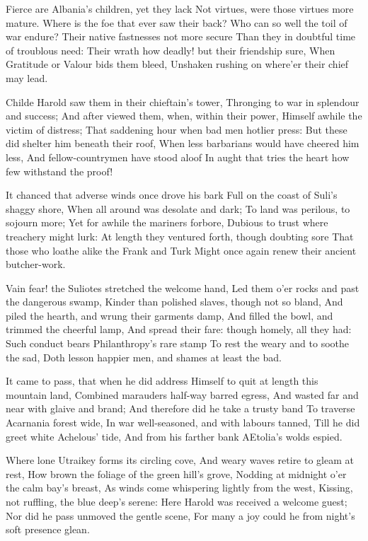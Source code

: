 \documentclass[10pt,twocolumn]{book}
\begin{document}
   Fierce are Albania's children, yet they lack
   Not virtues, were those virtues more mature.
   Where is the foe that ever saw their back?
   Who can so well the toil of war endure?
   Their native fastnesses not more secure
   Than they in doubtful time of troublous need:
   Their wrath how deadly! but their friendship sure,
   When Gratitude or Valour bids them bleed,
Unshaken rushing on where'er their chief may lead.


   Childe Harold saw them in their chieftain's tower,
   Thronging to war in splendour and success;
   And after viewed them, when, within their power,
   Himself awhile the victim of distress;
   That saddening hour when bad men hotlier press:
   But these did shelter him beneath their roof,
   When less barbarians would have cheered him less,
   And fellow-countrymen have stood aloof\textemdash
In aught that tries the heart how few withstand the proof!


   It chanced that adverse winds once drove his bark
   Full on the coast of Suli's shaggy shore,
   When all around was desolate and dark;
   To land was perilous, to sojourn more;
   Yet for awhile the mariners forbore,
   Dubious to trust where treachery might lurk:
   At length they ventured forth, though doubting sore
   That those who loathe alike the Frank and Turk
Might once again renew their ancient butcher-work.


   Vain fear! the Suliotes stretched the welcome hand,
   Led them o'er rocks and past the dangerous swamp,
   Kinder than polished slaves, though not so bland,
   And piled the hearth, and wrung their garments damp,
   And filled the bowl, and trimmed the cheerful lamp,
   And spread their fare:  though homely, all they had:
   Such conduct bears Philanthropy's rare stamp\textemdash
   To rest the weary and to soothe the sad,
Doth lesson happier men, and shames at least the bad.


   It came to pass, that when he did address
   Himself to quit at length this mountain land,
   Combined marauders half-way barred egress,
   And wasted far and near with glaive and brand;
   And therefore did he take a trusty band
   To traverse Acarnania forest wide,
   In war well-seasoned, and with labours tanned,
   Till he did greet white Achelous' tide,
And from his farther bank AEtolia's wolds espied.


   Where lone Utraikey forms its circling cove,
   And weary waves retire to gleam at rest,
   How brown the foliage of the green hill's grove,
   Nodding at midnight o'er the calm bay's breast,
   As winds come whispering lightly from the west,
   Kissing, not ruffling, the blue deep's serene:
   Here Harold was received a welcome guest;
   Nor did he pass unmoved the gentle scene,
For many a joy could he from night's soft presence glean.
\end{document}
